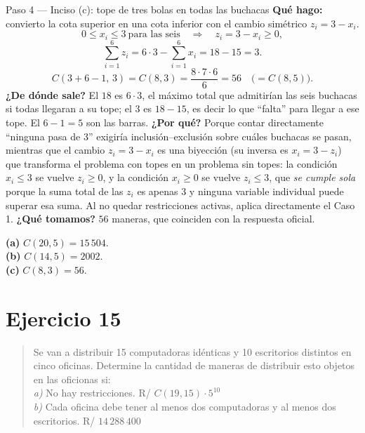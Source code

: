 \documentclass[11pt]{article}
\begin{document}
\begin{paso}{Paso 4 --- Inciso (c): tope de tres bolas en todas las buchacas}
\textbf{Qué hago:} convierto la cota superior en una cota inferior con el cambio simétrico $z_i=3-x_i$.
\[
0\le x_i\le 3\ \text{para las seis}\quad\Longrightarrow\quad z_i=3-x_i\ge0,
\]
\[
\sum_{i=1}^{6} z_i=6\cdot 3-\sum_{i=1}^{6}x_i=18-15=3 .
\]
\[
C(3+6-1,\,3)=C(8,3)=\frac{8\cdot7\cdot6}{6}=56\quad\bigl(=C(8,5)\bigr).
\]
\textbf{¿De dónde sale?} El $18$ es $6\cdot 3$, el máximo total que admitirían las seis buchacas si todas llegaran a su tope; el $3$ es $18-15$, es decir lo que ``falta'' para llegar a ese tope. El $6-1=5$ son las barras.
\textbf{¿Por qué?} Porque contar directamente ``ninguna pasa de 3'' exigiría inclusión--exclusión sobre cuáles buchacas se pasan, mientras que el cambio $z_i=3-x_i$ es una biyección (su inversa es $x_i=3-z_i$) que transforma el problema con topes en un problema sin topes: la condición $x_i\le3$ se vuelve $z_i\ge0$, y la condición $x_i\ge0$ se vuelve $z_i\le3$, que \emph{se cumple sola} porque la suma total de las $z_i$ es apenas $3$ y ninguna variable individual puede superar esa suma. Al no quedar restricciones activas, aplica directamente el Caso 1.
\textbf{¿Qué tomamos?} $56$ maneras, que coinciden con la respuesta oficial.
\end{paso}

\begin{resp}
\textbf{(a)} $C(20,5)=15\,504$.\\
\textbf{(b)} $C(14,5)=2002$.\\
\textbf{(c)} $C(8,3)=56$.
\end{resp}

\section*{Ejercicio 15}

\begin{quote}
Se van a distribuir 15 computadoras idénticas y 10 escritorios distintos en cinco oficinas. Determine la cantidad de maneras de distribuir esto objetos en las oficionas si:\\
\textit{a)} No hay restricciones. \hfill R/ $C(19,15)\cdot 5^{10}$\\
\textit{b)} Cada oficina debe tener al menos dos computadoras y al menos dos escritorios. \hfill R/ $14\,288\,400$
\end{quote}
\end{document}
